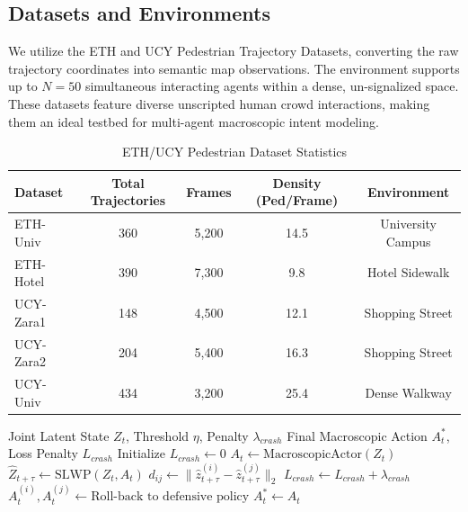 \documentclass[conference]{IEEEtran}
\begin{document}
\subsection{Datasets and Environments}
We utilize the ETH and UCY Pedestrian Trajectory Datasets, converting the raw trajectory coordinates into semantic map observations. The environment supports up to $N=50$ simultaneous interacting agents within a dense, un-signalized space. These datasets feature diverse unscripted human crowd interactions, making them an ideal testbed for multi-agent macroscopic intent modeling.

\begin{table}[t]
\centering
\caption{ETH/UCY Pedestrian Dataset Statistics}
\label{tab:dataset}
\begin{tabular}{@{}l c c c c@{}}
\toprule
\textbf{Dataset} & \textbf{Total Trajectories} & \textbf{Frames} & \textbf{Density (Ped/Frame)} & \textbf{Environment} \\
\midrule
ETH-Univ & 360 & 5,200 & 14.5 & University Campus \\
ETH-Hotel & 390 & 7,300 & 9.8 & Hotel Sidewalk \\
UCY-Zara1 & 148 & 4,500 & 12.1 & Shopping Street \\
UCY-Zara2 & 204 & 5,400 & 16.3 & Shopping Street \\
UCY-Univ & 434 & 3,200 & 25.4 & Dense Walkway \\
\bottomrule
\end{tabular}
\end{table}

\begin{algorithm}[h]
\caption{MA-WAC Roll-back Auditing Loop}
\label{alg:auditor}
\begin{algorithmic}[1]
\Require Joint Latent State $Z_t$, Threshold $\eta$, Penalty $\lambda_{crash}$
\Ensure Final Macroscopic Action $A_t^*$, Loss Penalty $L_{crash}$
\State Initialize $L_{crash} \gets 0$
\State $A_t \gets \text{MacroscopicActor}(Z_t)$ 
\State $\hat{Z}_{t+\tau} \gets \text{SLWP}(Z_t, A_t)$ 
    \State $d_{ij} \gets \lVert \hat{z}_{t+\tau}^{(i)} - \hat{z}_{t+\tau}^{(j)} \rVert_2$
        \State $L_{crash} \gets L_{crash} + \lambda_{crash}$ 
        \State $A_t^{(i)}, A_t^{(j)} \gets \text{Roll-back to defensive policy}$
    \EndIf
\EndFor
\State $A_t^* \gets A_t$ 
\end{algorithmic}
\end{algorithm}
\end{document}
